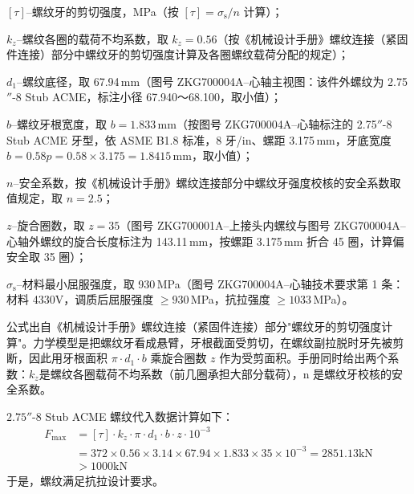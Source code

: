 $[\tau]$--螺纹牙的剪切强度，MPa（按 $[\tau]=\sigma_{\mathrm{s}}/n$ 计算）；

$k_z$--螺纹各圈的载荷不均系数，取 $k_z = 0.56$（按《机械设计手册》螺纹连接（紧固件连接）部分中螺纹牙的剪切强度计算及各圈螺纹载荷分配的规定\cite{ref26}）；

$d_1$--螺纹底径，取 67.94\,mm（图号 ZKG700004A--心轴主视图：该件外螺纹为 2.75$''$-8 Stub ACME，标注小径 67.940～68.100，取小值）；

$b$--螺纹牙根宽度，取 $b=1.833\,\text{mm}$（按图号 ZKG700004A--心轴标注的 2.75$''$-8 Stub ACME 牙型，依 ASME B1.8 标准，8 牙/in、螺距 3.175\,mm，牙底宽度 $b = 0.58p = 0.58 \times 3.175 = 1.8415\,\text{mm}$，取小值）；

$n$--安全系数，按《机械设计手册》螺纹连接部分中螺纹牙强度校核的安全系数取值规定\cite{ref26}，取 $n = 2.5$；

$z$--旋合圈数，取 $z=35$（图号 ZKG700001A--上接头内螺纹与图号 ZKG700004A--心轴外螺纹的旋合长度标注为 143.11\,mm，按螺距 3.175\,mm 折合 45 圈，计算偏安全取 35 圈）；

$\sigma_{\mathrm{s}}$--材料最小屈服强度，取 930\,MPa（图号 ZKG700004A--心轴技术要求第 1 条：材料 4330V，调质后屈服强度 $\ge 930$\,MPa，抗拉强度 $\ge 1033$\,MPa）。

公式出自《机械设计手册》螺纹连接（紧固件连接）部分"螺纹牙的剪切强度计算"。力学模型是把螺纹牙看成悬臂，牙根截面受剪切，在螺纹副拉脱时牙先被剪断，因此用牙根面积 \(\pi \cdot d_1 \cdot b\) 乘旋合圈数 \(z\) 作为受剪面积。手册同时给出两个系数：$k_z$是螺纹各圈载荷不均系数（前几圈承担大部分载荷），n 是螺纹牙校核的安全系数。

$2.75''\text{-}8$ Stub ACME 螺纹代入数据计算如下：
\begin{align}
    F_{\max} &= [\tau] \cdot k_z \cdot \pi \cdot d_1 \cdot b \cdot z \cdot 10^{-3} \nonumber \\
    &= 372 \times 0.56 \times 3.14 \times 67.94 \times 1.833 \times 35 \times 10^{-3} = 2851.13 \text{kN} \\
    &> 1000 \text{kN} \nonumber
\end{align}
于是，螺纹满足抗拉设计要求。

